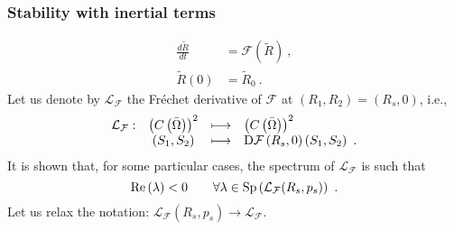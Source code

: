 \documentclass[10pt,aspectratio=169]{beamer}
\begin{document}
\begin{frame}
\frametitle{Stability with inertial terms}
\vspace*{0.5cm}
\begin{equation}
\begin{split}
\frac{d\tilde{R}}{dt}&=\mathcal{F}(\tilde{R})~,\\
\tilde{R}(0)&=\tilde{R}_0~.
\end{split}
\end{equation}
Let us denote by $\mathcal{L}_\mathcal{F}$ the Fréchet derivative of $\mathcal{F}$ at $\left(R_1,R_2\right)=\left(R_s,0\right)$, i.e.,
\begin{equation}
\begin{array}{cccl}
\mathcal{L}_\mathcal{F}:&\left(C\left(\bar{\Omega}\right)\right)^2&\longmapsto& \left(C\left(\bar{\Omega}\right)\right)^2\\
&(S_1,S_2)& \longmapsto & \textnormal{D}\mathcal{F}\left(R_s,0\right)\left(S_1,S_2\right)~.\label{eq:jacobian_inertia}
\end{array}
\end{equation} 
It is shown that, for some particular cases, the spectrum of $\mathcal{L}_\mathcal{F}$ is such that $$\mbox{Re}\left(\lambda\right)<0\qquad \forall \lambda\in \textnormal{Sp}\left(\mathcal{L}_\mathcal{F}(R_s,p_s)\right)~.$$
{\color{red}
Let us relax the notation: $\mathcal{L}_\mathcal{F}(R_s,p_s)\rightarrow \mathcal{L}_\mathcal{F}$.}
\end{frame}



\end{document}
